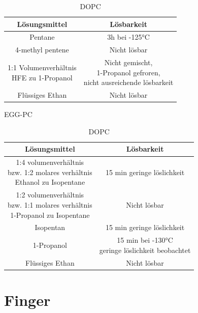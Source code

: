 \begin{table}[h]
	\begin{subtable}{\linewidth}
		\centering
		\begin{tabular}{|c|c|}
		\hline
		Lösungsmittel & Lösbarkeit \\
		\hline
		Pentane & 3h bei -125°C \\
		\hline
		4-methyl pentene & Nicht lösbar \\
		\hline
		\makecell{1:1 Volumenverhältnis\\ HFE zu 1-Propanol} & \makecell{Nicht gemischt,\\ 1-Propanol gefroren,\\ nicht ausreichende lösbarkeit}\\
		\hline
		Flüssiges Ethan & Nicht lösbar \\
		\hline
		\end{tabular}
		\caption{EGG-PC}
		\label{table:EGG-PCCryoloeslichkeit}
	\end{subtable}
	\begin{subtable}{\linewidth}
		\centering
		\begin{tabular}{|c|c|}
		\hline
		Lösungsmittel & Lösbarkeit \\
		\hline
		\makecell{1:4 volumenverhältnis\\ bzw. 1:2 molares verhältnis\\ Ethanol zu Isopentane} & 15 min geringe löslichkeit\\
		\hline
		\makecell{1:2 volumenverhältnis\\ bzw. 1:1 molares verhältnis\\ 1-Propanol zu Isopentane} & Nicht lösbar \\
		\hline
		Isopentan & 15 min geringe löslichkeit\\
		\hline
		1-Propanol & \makecell{15 min bei -130°C\\ geringe löslichkeit beobachtet}\\
		\hline
		Flüssiges Ethan & Nicht lösbar \\
		\hline
		\end{tabular}
		\caption{DOPC}
		\label{table:DOPCCryoloeslichkeit}
	\end{subtable}
	\label{table:Cryoloeslichkeit}
\end{table}

\section{Finger}

